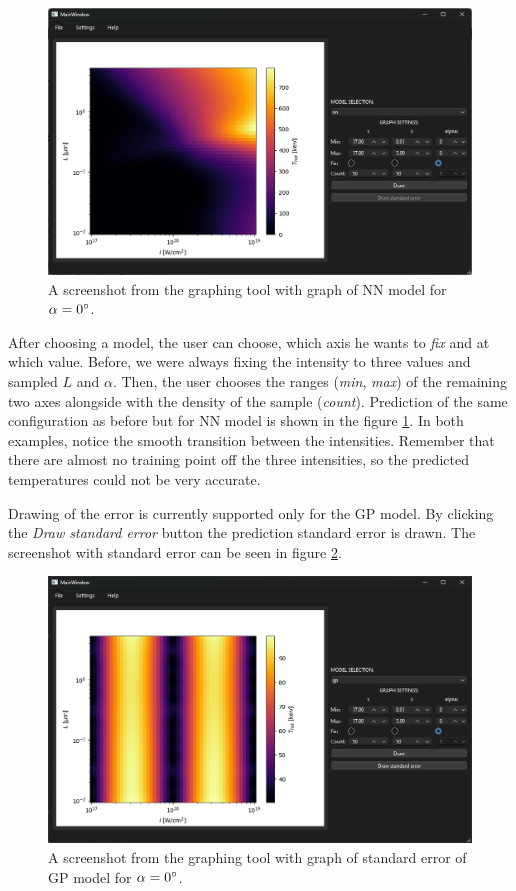 \begin{figure}[h]
	\centering
	\includegraphics[width=0.85 \textwidth]{figures/graph_tool2}
	\caption{A screenshot from the graphing tool with graph of NN model for $\alpha = 0\degree$.}
	\label{fig:graph-tool2}
\end{figure}


After choosing a model, the user can choose, which axis he wants to \textit{fix} and at which value. Before, we were always fixing the intensity to three values and sampled $L$ and $\alpha$. Then, the user chooses the ranges (\textit{min}, \textit{max}) of the remaining two axes alongside with the density of the sample (\textit{count}). Prediction of the same configuration as before but for NN model is shown in the figure \ref{fig:graph-tool2}. In both examples, notice the smooth transition between the intensities. Remember that there are almost no training point off the three intensities, so the predicted temperatures could not be very accurate.

Drawing of the error is currently supported only for the GP model. By clicking the \textit{Draw standard error} button the prediction standard error is drawn. The screenshot with standard error can be seen in figure \ref{fig:graph-tool3}.

\begin{figure}[h]
	\centering
	\includegraphics[width=0.85 \textwidth]{figures/graph_tool3}
	\caption{A screenshot from the graphing tool with graph of standard error of GP model for $\alpha = 0\degree$.}
	\label{fig:graph-tool3}
\end{figure}

